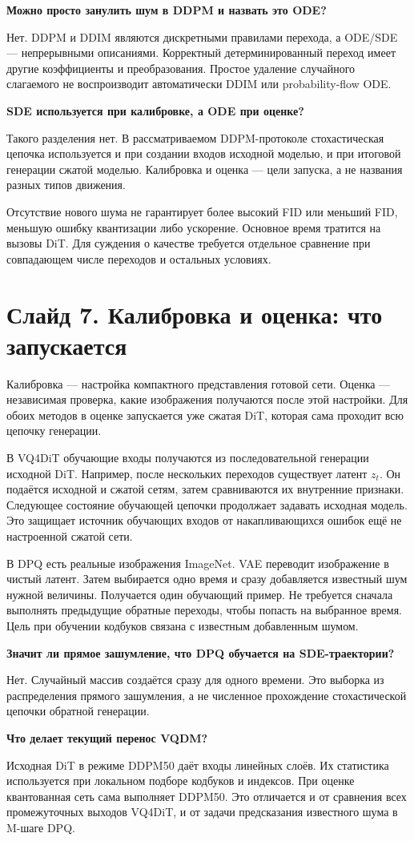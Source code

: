 \documentclass[a4paper,11pt]{article}
\newcommand{\slide}[2]{\clearpage\section*{Слайд #1. #2}}
\newcommand{\question}[1]{\par\textbf{#1}\par}
\begin{document}
\question{Можно просто занулить шум в DDPM и назвать это ODE?}
Нет. DDPM и DDIM являются дискретными правилами перехода, а ODE/SDE ---
непрерывными описаниями. Корректный детерминированный переход имеет
другие коэффициенты и преобразования. Простое удаление случайного
слагаемого не воспроизводит автоматически DDIM или probability-flow ODE.

\question{SDE используется при калибровке, а ODE при оценке?}
Такого разделения нет. В рассматриваемом DDPM-протоколе стохастическая
цепочка используется и при создании входов исходной моделью, и при
итоговой генерации сжатой моделью. Калибровка и оценка --- цели запуска,
а не названия разных типов движения.

Отсутствие нового шума не гарантирует более высокий FID или меньший FID,
меньшую ошибку квантизации либо ускорение. Основное время тратится
на вызовы DiT. Для суждения о качестве требуется отдельное сравнение
при совпадающем числе переходов и остальных условиях.

\slide{7}{Калибровка и оценка: что запускается}
Калибровка --- настройка компактного представления готовой сети.
Оценка --- независимая проверка, какие изображения получаются после
этой настройки. Для обоих методов в оценке запускается уже сжатая DiT,
которая сама проходит всю цепочку генерации.

В VQ4DiT обучающие входы получаются из последовательной генерации
исходной DiT. Например, после нескольких переходов существует
латент $z_t$. Он подаётся исходной и сжатой сетям, затем сравниваются
их внутренние признаки. Следующее состояние обучающей цепочки
продолжает задавать исходная модель. Это защищает источник обучающих
входов от накапливающихся ошибок ещё не настроенной сжатой сети.

В DPQ есть реальные изображения ImageNet. VAE переводит изображение
в чистый латент. Затем выбирается одно время и сразу добавляется
известный шум нужной величины. Получается один обучающий пример.
Не требуется сначала выполнять предыдущие обратные переходы,
чтобы попасть на выбранное время. Цель при обучении кодбуков
связана с известным добавленным шумом.

\question{Значит ли прямое зашумление, что DPQ обучается на SDE-траектории?}
Нет. Случайный массив создаётся сразу для одного времени. Это выборка
из распределения прямого зашумления, а не численное прохождение
стохастической цепочки обратной генерации.

\question{Что делает текущий перенос VQDM?}
Исходная DiT в режиме DDPM50 даёт входы линейных слоёв. Их статистика
используется при локальном подборе кодбуков и индексов.
При оценке квантованная сеть сама выполняет DDPM50.
Это отличается и от сравнения всех промежуточных выходов VQ4DiT,
и от задачи предсказания известного шума в M-шаге DPQ.
\end{document}

